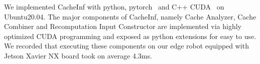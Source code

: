 We implemented CacheInf with python, pytorch~\cite{paszke2017automatic} and C++ CUDA~\cite{cuda} on Ubuntu20.04.
The major components of CacheInf, namely Cache Analyzer, Cache Combiner and Recomputation Input Constructor are implemented via highly optimized CUDA programming and exposed as python extensions for easy to use.
We recorded that executing these components on our edge robot equipped with Jetson Xavier NX board took on average 4.3ms.
